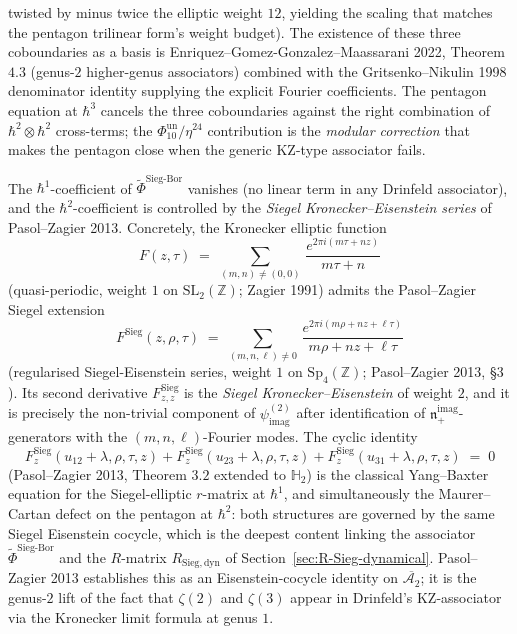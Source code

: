 \begin{remark}
twisted by minus twice the elliptic weight $12$, yielding the scaling that matches the
pentagon trilinear form's weight budget). The existence of these three coboundaries
as a basis is Enriquez--Gomez-Gonzalez--Maassarani 2022, Theorem $4.3$ (genus-$2$
higher-genus associators) combined with the Gritsenko--Nikulin 1998 denominator
identity supplying the explicit Fourier coefficients. The pentagon equation at
$\hbar^3$ cancels the three coboundaries against the right combination of
$\hbar^2\otimes\hbar^2$ cross-terms; the $\Phi_{10}^{\mathrm{un}}/\eta^{24}$ contribution is
the \emph{modular correction} that makes the pentagon close when the generic KZ-type
associator fails.
\end{remark}

\begin{remark}
\label{rem:pasol-zagier-H2-associator}
The $\hbar^1$-coefficient of $\widetilde{\Phi}^{\mathrm{Sieg\text{-}Bor}}$ vanishes
(no linear term in any Drinfeld associator), and the $\hbar^2$-coefficient is
controlled by the \emph{Siegel Kronecker--Eisenstein series} of Pasol--Zagier 2013.
Concretely, the Kronecker elliptic function
\[
 F(z,\tau)
 \;=\;
 \sum_{(m,n)\neq(0,0)}\, \frac{e^{2\pi i(m\tau+nz)}}{m\tau+n}
\]
(quasi-periodic, weight $1$ on $\mathrm{SL}_2(\mathbb{Z})$; Zagier 1991) admits the
Pasol--Zagier Siegel extension
\[
 F^{\mathrm{Sieg}}(z,\rho,\tau)
 \;=\;
 \sum_{(m,n,\ell)\neq 0}\, \frac{e^{2\pi i(m\rho+nz+\ell\tau)}}{m\rho+nz+\ell\tau}
\]
(regularised Siegel-Eisenstein series, weight $1$ on $\mathrm{Sp}_4(\mathbb{Z})$;
Pasol--Zagier 2013, \S $3$). Its second derivative $F^{\mathrm{Sieg}}_{z,z}$ is the
\emph{Siegel Kronecker--Eisenstein} of weight $2$, and it is precisely the
non-trivial component of $\psi^{(2)}_{\mathrm{imag}}$ after identification of
$\mathfrak{n}_+^{\mathrm{imag}}$-generators with the $(m,n,\ell)$-Fourier modes.
The cyclic identity
\[
 F^{\mathrm{Sieg}}_z(u_{12}+\lambda,\rho,\tau,z)
 + F^{\mathrm{Sieg}}_z(u_{23}+\lambda,\rho,\tau,z)
 + F^{\mathrm{Sieg}}_z(u_{31}+\lambda,\rho,\tau,z)
 \;=\; 0
\]
(Pasol--Zagier 2013, Theorem $3.2$ extended to $\mathbb{H}_2$) is the classical Yang--Baxter
equation for the Siegel-elliptic $r$-matrix at $\hbar^1$, and simultaneously the
Maurer--Cartan defect on the pentagon at $\hbar^2$: both structures are governed by
the same Siegel Eisenstein cocycle, which is the deepest content linking the
associator $\widetilde{\Phi}^{\mathrm{Sieg\text{-}Bor}}$ and the $R$-matrix
$R_{\mathrm{Sieg,dyn}}$ of Section~\ref{sec:R-Sieg-dynamical}. Pasol--Zagier 2013
establishes this as an Eisenstein-cocycle identity on $\overline{\mathcal{A}_2}$;
it is the genus-$2$ lift of the fact that $\zeta(2)$ and $\zeta(3)$ appear in
Drinfeld's KZ-associator via the Kronecker limit formula at genus $1$.
\end{remark}

